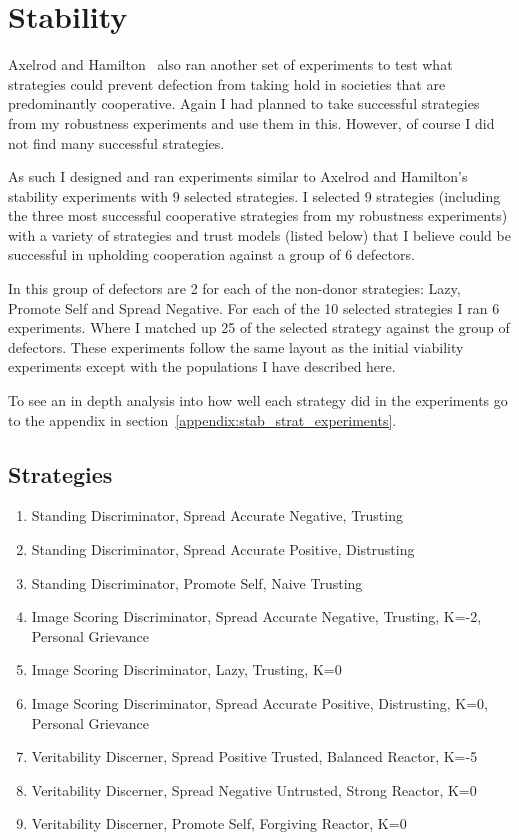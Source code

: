 \documentclass[]{final_report}
\begin{document}
\section{Stability}
Axelrod and Hamilton~\cite{evolution_of_cooperation} also ran another set of experiments to test what strategies could prevent defection from taking hold in societies that are predominantly cooperative. Again I had planned to take successful strategies from my robustness experiments and use them in this. However, of course I did not find many successful strategies.\par 
As such I designed and ran experiments similar to Axelrod and Hamilton's stability experiments with 9 selected strategies. I selected 9 strategies (including the three most successful cooperative strategies from my robustness experiments) with a variety of strategies and trust models (listed below) that I believe could be successful in upholding cooperation against a group of 6 defectors.\par 
In this group of defectors are 2 for each of the non-donor strategies: Lazy, Promote Self and Spread Negative. For each of the 10 selected strategies I ran 6 experiments. Where I matched up 25 of the selected strategy against the group of defectors. These experiments follow the same layout as the initial viability experiments except with the populations I have described here.\par 
To see an in depth analysis into how well each strategy did in the experiments go to the appendix in section~\ref{appendix:stab_strat_experiments}.

\subsection{Strategies}
\begin{enumerate}
	\item Standing Discriminator, Spread Accurate Negative, Trusting
	\item Standing Discriminator, Spread Accurate Positive, Distrusting
	\item Standing Discriminator, Promote Self, Naive Trusting
	\item Image Scoring Discriminator, Spread Accurate Negative, Trusting, K=-2, Personal Grievance
	\item Image Scoring Discriminator, Lazy, Trusting, K=0
	\item Image Scoring Discriminator, Spread Accurate Positive, Distrusting, K=0, Personal Grievance
	\item Veritability Discerner, Spread Positive Trusted, Balanced Reactor, K=-5
	\item Veritability Discerner, Spread Negative Untrusted, Strong Reactor, K=0
	\item Veritability Discerner, Promote Self, Forgiving Reactor, K=0
\end{enumerate}
\end{document}
